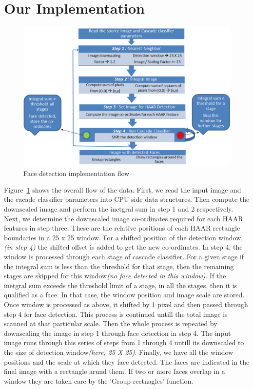 \section{Our Implementation }\label{sec:impl}

\begin{figure}[h]
  \centering
  \includegraphics[width=0.75\linewidth]{figs/flow_crop.pdf}
  \caption{Face detection implementation flow }
  \label{fig:flow}
\end{figure}


Figure~\ref{fig:flow} shows the overall flow of the data. First, we read
the input image and the cacade classifier parameters into CPU side data structures. 
Then compute the downscaled image and perform the inetgral sum in step 1 and 2 respectively. 
Next, we determine the downscaled image co-ordinates required for each HAAR features in step three. 
These are the relative positions of each HAAR rectangle boundaries in a 25 x 25 window. 
For a shifted position of the detection window,\textit{(in step 4)} the shifted offset is added to get the new co-ordinates. 
In step 4, the window is processed through each stage of cascade classifier. 
For a given stage if the integral sum is less than the threshold for that stage, 
then the remaining stages are skipped for this window\textit{(no face detected in this window)}. 
If the inetgral sum exceeds the threshold limit of a stage, in all the stages, then it is qualified as a face. 
In that case, the window position and image scale are stored. Once window is processed as above, 
it shifted by 1 pixel and then passed through step 4 for face detection. 
This process is continued untill the total image is scanned at that particular scale. 
Then the whole process is repeated by downscaling the image in step 1 through face detection in step 4. The input image runs through this series of steps from 1 through 4 untill its downscaled to the size of detection window\textit{(here, 25 X 25)}. 
Finally, we have all the window positions and the scale at which they face detected. The faces 
are indicated in the final image with a rectangle arund them. If two or more faces overlap in a window 
they are taken care by the 'Group rectnagles' function. 

